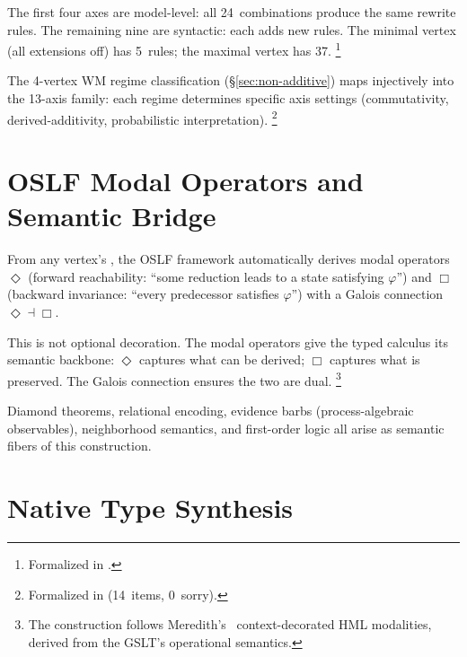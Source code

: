 \documentclass[11pt,openany]{report}
\begin{document}
\noindent
The first four axes are model-level: all 24~combinations produce the
same rewrite rules.  The remaining nine are syntactic: each adds new
rules.  The minimal vertex (all extensions off) has 5~rules; the
maximal vertex has 37.%
\footnote{Formalized in
.}


\noindent
The 4-vertex WM regime classification
(\S\ref{sec:non-additive}) maps injectively into the 13-axis
family: each regime determines specific axis settings
(commutativity, derived-additivity, probabilistic
interpretation).%
\footnote{Formalized in
(14~items, 0~sorry).}


\section{OSLF Modal Operators and Semantic Bridge}

From any vertex's , the OSLF framework automatically
derives modal operators $\Diamond$ (forward reachability: ``some
reduction leads to a state satisfying $\varphi$'') and $\Box$
(backward invariance: ``every predecessor satisfies $\varphi$'') with
a Galois connection $\Diamond \dashv \Box$.

This is not optional decoration.  The modal operators give the typed
calculus its semantic backbone: $\Diamond$ captures what can be
derived; $\Box$ captures what is preserved.  The Galois connection
ensures the two are dual.%
\footnote{The construction follows
Meredith's~\cite{meredith2026ccc} context-decorated HML modalities,
derived from the GSLT's operational semantics.}

Diamond theorems, relational encoding, evidence barbs
(process-algebraic observables), neighborhood semantics, and
first-order logic all arise as semantic fibers of this construction.


\section{Native Type Synthesis}
\end{document}
